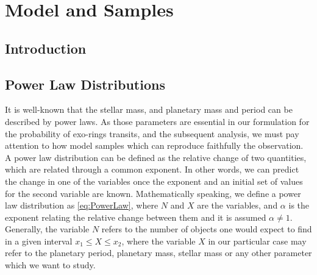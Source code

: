 \chapter{\textbf{Model and Samples}}\label{ch: Model}

\section{Introduction}


\section{Power Law Distributions}\label{sec:PowerLawSec}

It is well-known that the stellar mass, and planetary mass and period can be described by power laws. As those parameters are essential in our formulation for the probability of exo-rings transits, and the subsequent analysis, we must pay attention to how model samples which can reproduce faithfully the observation.\\

A power law distribution can be defined as the relative change of two quantities, which are related through a common exponent. In other words, we can predict the change in one of the variables once the exponent and an initial set of values for the second variable are known. Mathematically speaking, we define a power law distribution as \autoref{eq:PowerLaw}, where $N$ and $X$ are the variables, and $\alpha$ is the exponent relating the relative change between them and it is assumed $\alpha \neq 1$. Generally, the variable $N$ refers to the number of objects one would expect to find in a given interval $x_1 \leq X \leq x_2$, where the variable $X$ in our particular case may refer to the planetary period, planetary mass, stellar mass or any other parameter which we want to study.\\ 

